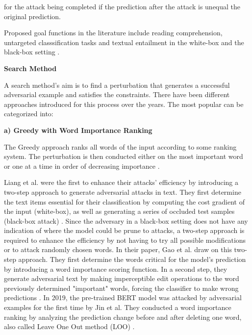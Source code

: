 for the attack being completed if the prediction after the attack is unequal the original prediction. 

Proposed goal functions in the literature include reading comprehension, untargeted classsification tasks \cite{ebrahimi2017hotflip, alzantot2018generating, li2018textbugger, jin2019bert, garg2020bae} and textual entailment \cite{jin2019bert, alzantot2018generating} in the white-box \cite{papernot2016crafting, liang2017deep, ebrahimi2017hotflip, jin2019bert} and the black-box setting \cite{gao2018black, goodman2020fastwordbug}.

\textbf{Search Method}
\label{sec:search_method}

A search method's aim is to find a perturbation that generates a successful adversarial example and satisfies the constraints. There have been different approaches introduced for this process over the years. The most popular can be categorized into:

    \textbf{a) Greedy with Word Importance Ranking}
    
        The Greedy approach ranks all words of the input according to some ranking system. The perturbation is then conducted either on the most important word or one at a time in order of decreasing importance \cite{li2018textbugger, jin2019bert, garg2020bae}.
    
        Liang et al. were the first to enhance their attacks' efficiency by introducing a two-step approach to generate adversarial attacks in text. They first determine the text items essential for their classification by computing the cost gradient of the input (white-box), as well as generating a series of occluded test samples (black-box attack) \cite{liang2017deep}. 
        Since the adversary in a black-box setting does not have any indication of where the model could be prune to attacks, a two-step approach is required to enhance the efficiency by not having to try all possible modifications or to attack randomly chosen words. 
        In their paper, Gao et al. draw on this two-step approach. They first determine the words critical for the model's prediction by introducing a word importance scoring function. In a second step, they generate adversarial text by making imperceptible edit operations to the word previously determined "important" words, forcing the classifier to make wrong predictions \cite{gao2018black}.
        In 2019, the pre-trained BERT model was attacked by adversarial examples for the first time by Jin et al. They conducted a word importance ranking by analyzing the prediction change before and after deleting one word, also called Leave One Out method (LOO) \cite{jin2019bert}.  
        
